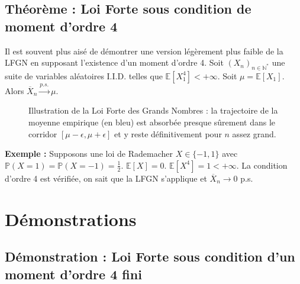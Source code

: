 \documentclass[11pt,a4paper]{article}
\begin{document}
\subsection{Théorème : Loi Forte sous condition de moment d'ordre 4}
Il est souvent plus aisé de démontrer une version légèrement plus faible de la LFGN en supposant l'existence d'un moment d'ordre 4.
Soit $(X_n)_{n \in \mathbb{N}^*}$ une suite de variables aléatoires I.I.D. telles que $\mathbb{E}[X_1^4] < +\infty$. Soit $\mu = \mathbb{E}[X_1]$.
Alors $\overline{X}_n \xrightarrow{p.s.} \mu$.

\begin{figure}[h]
\centering
{}
\caption{Illustration de la Loi Forte des Grands Nombres : la trajectoire de la moyenne empirique (en bleu) est absorbée presque sûrement dans le corridor $[\mu-\epsilon, \mu+\epsilon]$ et y reste définitivement pour $n$ assez grand.}
\end{figure}

\textbf{Exemple :} Supposons une loi de Rademacher $X \in \{-1, 1\}$ avec $\mathbb{P}(X=1) = \mathbb{P}(X=-1) = \frac{1}{2}$. $\mathbb{E}[X] = 0$. $\mathbb{E}[X^4] = 1 < +\infty$. La condition d'ordre 4 est vérifiée, on sait que la LFGN s'applique et $\overline{X}_n \to 0$ p.s.

\section{Démonstrations}

\subsection{Démonstration : Loi Forte sous condition d'un moment d'ordre 4 fini}
\end{document}

